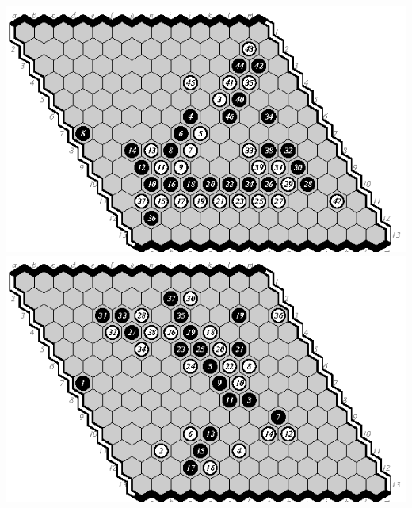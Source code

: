 \documentclass{icga}
\begin{document}
\includegraphics[scale=1.3]{13.03m-d.swap.eps}\hspace*{-2.5cm}\includegraphics[scale=1.3]{13.04m-e.eps}
\end{document}
